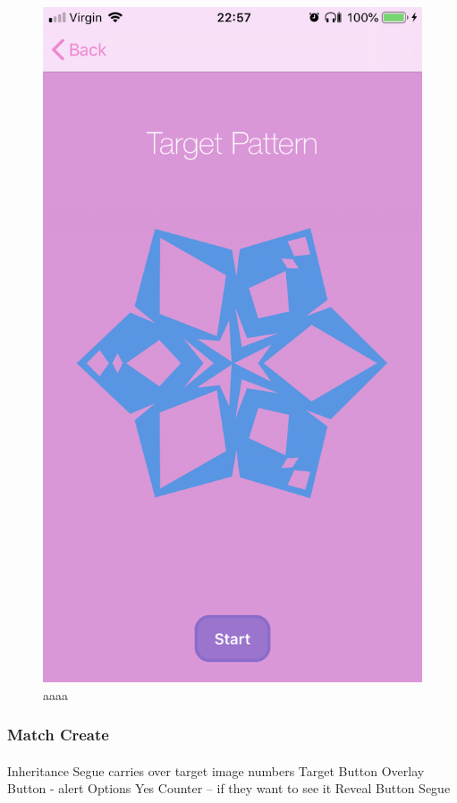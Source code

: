 \documentclass[11pt]{article}
\begin{document}
\begin{figure}[!ht]
\begin{minipage}{0.45\textwidth}
                            \centering
                            \includegraphics[width=0.7\linewidth]{KiriZen/complexTarget.png}
                            \caption{aaaa}
                            \label{fig:kiriZen-complexTarget}
                        \end{minipage}
                    \end{figure}
                    
        \subsubsection{Match Create}
    
            \paragraph{}
            
            Inheritance 
            Segue carries over target image numbers
            Target Button
            Overlay Button - alert
            Options
            Yes Counter – if they want to see it
            Reveal Button Segue
\end{document}
